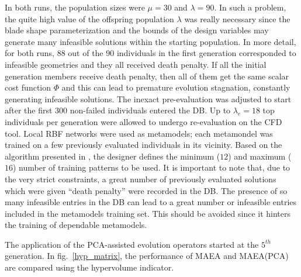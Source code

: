 In both runs, the  population sizes were $\mu\!=\!30$ and $\lambda\!=\!90$. In such a problem, the quite high value of the offspring population $\lambda$ was really necessary since the blade shape parameterization and the bounds of the design variables may generate many infeasible solutions  within the starting population. In more detail, for both runs, $88$ out of the $90$ individuals in the first generation corresponded to infeasible geometries and they all received death penalty. If all the initial generation members receive death penalty, then all of them get the same scalar cost function $\Phi$ and this can lead to premature evolution stagnation, constantly generating infeasible solutions. The inexact pre-evaluation was adjusted to start after the first $300$ non-failed individuals entered the DB. Up to $\lambda_e\!=\!18$ top individuals per generation were allowed to undergo re-evaluation on the CFD tool. Local  RBF networks were used as metamodels; each metamondel was trained on a few previously evaluated individuals in its vicinity. Based on the algorithm presented in \cite{LTT_2_029}, the designer defines the minimum ($12$) and maximum ($16$) number of training patterns to be used. It is important to note that, due to the very strict constraints, a great number of previously evaluated solutions which were given ``death penalty'' were recorded in the DB. The presence of so many infeasible entries in the DB can lead to a great number or infeasible entries included in the metamodels training set. This should be avoided since it hinters the training of dependable metamodels.

The application of the PCA-assisted evolution operators started at the $5^{th}$ generation. In fig.\ \ref{hyp_matrix}, the performance of MAEA and MAEA(PCA) are compared using the hypervolume indicator.


